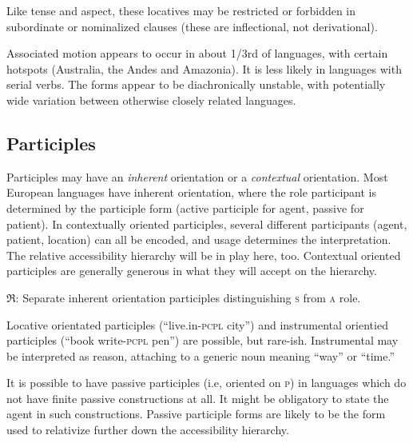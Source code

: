 \documentclass[11pt]{article}
\newcommand{\I}[1]{\textsc{#1}}   %
\newcommand{\rara}[1]{$\mathfrak{R}$: #1}
\begin{document}
{Like tense and aspect, these locatives may be restricted or forbidden
in subordinate or nominalized clauses (these are inflectional, not
derivational). 

Associated motion appears to occur in about 1/3rd of languages, with
certain hotspots (Australia, the Andes and Amazonia).  It is less
likely in languages with serial verbs.  The forms appear to be
diachronically unstable, with potentially wide variation between
otherwise closely related languages.


\subsection{Participles}
Participles may have an \textit{inherent} orientation or a
\textit{contextual} orientation.  Most European languages have
inherent orientation, where the role participant is determined by the
participle form (active participle for agent, passive for patient).
In contextually oriented participles, several different participants
(agent, patient, location) can all be encoded, and usage determines
the interpretation.  The relative accessibility hierarchy will be in
play here, too.  Contextual oriented participles are generally
generous in what they will accept on the hierarchy.

\rara{Separate inherent orientation participles distinguishing \I{s}
from \I{a} role.}

Locative orientated participles (``live.in-\I{pcpl} city'') and
instrumental orientied participles (``book write-\I{pcpl} pen'') are
possible, but rare-ish.  Instrumental may be interpreted as reason,
attaching to a generic noun meaning ``way'' or ``time.''

It is possible to have passive participles (i.e, oriented on \I{p}) in
languages which do not have finite passive constructions at all.  It
might be obligatory to state the agent in such constructions.  Passive
participle forms are likely to be the form used to relativize further
down the accessibility hierarchy.

}
\end{document}

